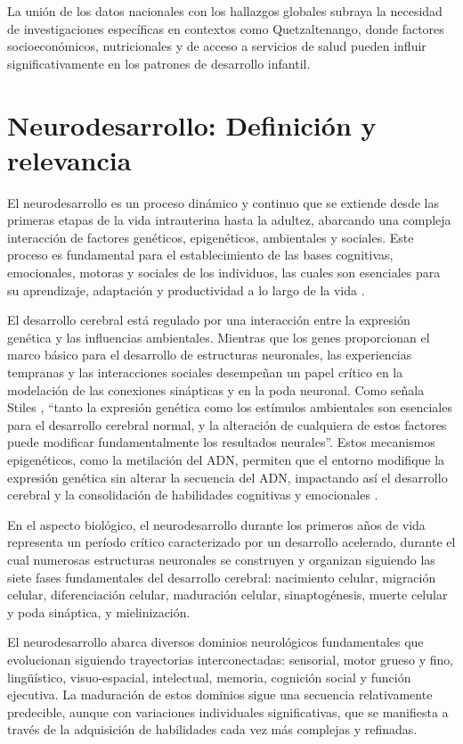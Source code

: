 \documentclass[11pt,letterpaper]{report}
\begin{document}
La unión de los datos nacionales con los hallazgos globales subraya la 
necesidad de investigaciones específicas en contextos como Quetzaltenango, 
donde factores socioeconómicos, nutricionales y de acceso a servicios de salud 
pueden influir significativamente en los patrones de desarrollo infantil.

\section{Neurodesarrollo: Definición y relevancia}
El neurodesarrollo es un proceso dinámico y continuo que se extiende desde 
las primeras etapas de la vida intrauterina hasta la adultez, abarcando una 
compleja interacción de factores genéticos, epigenéticos, ambientales y 
sociales. Este proceso es fundamental para el establecimiento de las bases 
cognitivas, emocionales, motoras y sociales de los individuos, las cuales 
son esenciales para su aprendizaje, adaptación y productividad a lo largo 
de la vida \cite{Stiles2010, Nelson49}.

El desarrollo cerebral está regulado por una interacción entre la expresión 
genética y las influencias ambientales. Mientras que los genes proporcionan 
el marco básico para el desarrollo de estructuras neuronales, las 
experiencias tempranas y las interacciones sociales desempeñan un papel 
crítico en la modelación de las conexiones sinápticas y en la poda neuronal. 
Como señala Stiles \cite{Stiles2010}, ``tanto la expresión genética como los
estímulos ambientales son esenciales para el desarrollo cerebral normal, y la
alteración de cualquiera de estos factores puede modificar fundamentalmente los
resultados neurales''. Estos mecanismos epigenéticos, como la metilación del
ADN, permiten que el entorno modifique la expresión genética sin alterar la
secuencia del ADN,  impactando así el desarrollo cerebral y la consolidación de
habilidades cognitivas y emocionales \cite{Roth2011, Feldman2}.

En el aspecto biológico, el neurodesarrollo durante los primeros años de vida
representa un período crítico caracterizado por un desarrollo acelerado, 
durante el cual numerosas estructuras neuronales se construyen y organizan 
siguiendo las siete fases fundamentales del desarrollo cerebral: nacimiento 
celular, migración celular, diferenciación celular, maduración celular, 
sinaptogénesis, muerte celular y poda sináptica, y mielinización.
\cite{Kolb7}

El neurodesarrollo abarca diversos dominios neurológicos fundamentales que 
evolucionan siguiendo trayectorias interconectadas: sensorial, motor grueso y
fino, lingüístico, visuo-espacial, intelectual, memoria, cognición social y
función ejecutiva. La maduración de estos dominios sigue una secuencia
relativamente predecible, aunque con  variaciones individuales significativas,
que se manifiesta a través de la  adquisición de habilidades cada vez más
complejas y refinadas. \cite{Nelson49}
\end{document}
